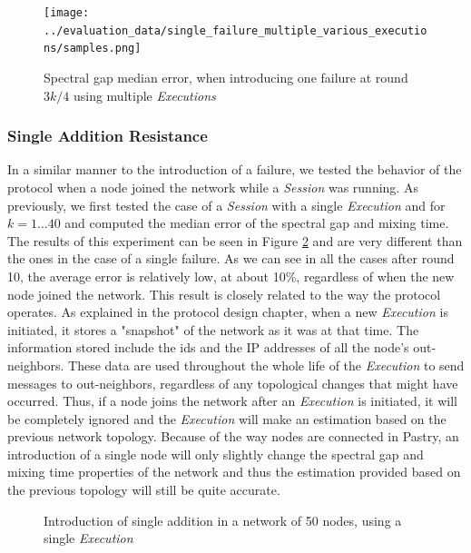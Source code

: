 \documentclass[a4paper,11pt,twoside]{report}
\begin{document}
\begin{figure}
   \centering
    \texttt{[image: ../evaluation\_data/single\_failure\_multiple\_various\_executions/samples.png]}
     \caption{Spectral gap median error, when introducing one failure at round $3k/4$ using multiple \textit{Executions}}
     \label{fig:single_failure_multiple}
\end{figure}

\subsubsection*{Single Addition Resistance}

In a similar manner to the introduction of a failure, we tested the behavior of the protocol when a node joined the network while a \textit{Session} was running. As previously, we first tested the case of a \textit{Session} with a single \textit{Execution} and for $k=1\dots40$ and computed the median error of the spectral gap and mixing time. \\

The results of this experiment can be seen in Figure \ref{fig:single_exec_addition} and are very different than the ones in the case of a single failure. As we can see in all the cases after round 10, the average error is relatively low, at about 10\%, regardless of when the new node joined the network. This result is closely related to the way the protocol operates. As explained in the protocol design chapter, when a new \textit{Execution} is initiated, it stores a "snapshot" of the network as it was at that time. The information stored include the ids and the IP addresses of all the node's out-neighbors. These data are used throughout the whole life of the \textit{Execution} to send messages to out-neighbors, regardless of any topological changes that might have occurred. Thus, if a node joins the network after an \textit{Execution} is initiated, it will be completely ignored and the \textit{Execution} will make an estimation based on the previous network topology. Because of the way nodes are connected in Pastry, an introduction of a single node will only slightly change the spectral gap and mixing time properties of the network and thus the estimation provided based on the previous topology will still be quite accurate. \\

\begin{figure} [h]
\centering
{}
\qquad
{}
\caption{Introduction of single addition in a network of 50 nodes, using a single \textit{Execution}}
\label{fig:single_exec_addition}
\end{figure}
\end{document}
